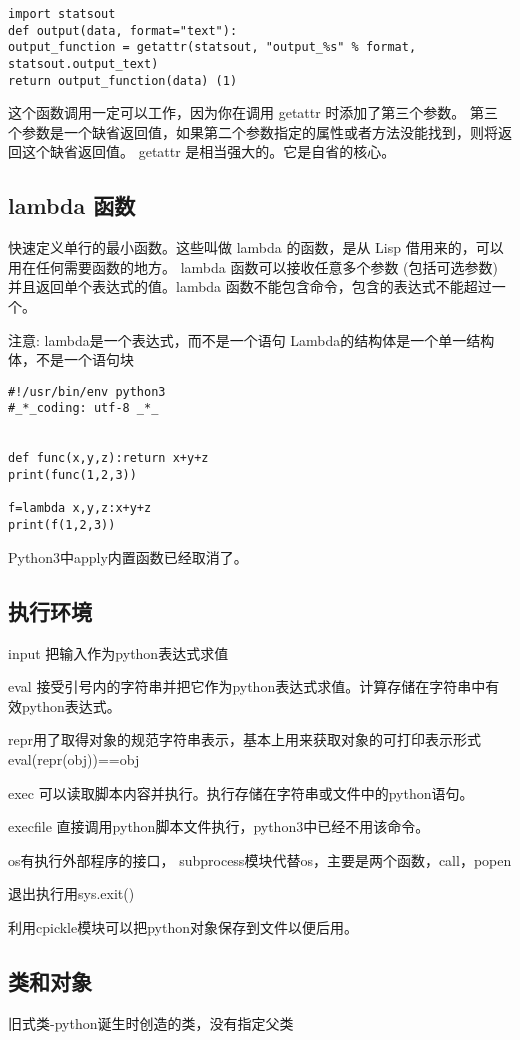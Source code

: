 \documentclass[twoside,11pt]{book}
\begin{document}
\begin{lstlisting}
import statsout
def output(data, format="text"):
output_function = getattr(statsout, "output_%s" % format, statsout.output_text)
return output_function(data) (1)
\end{lstlisting}

这个函数调用一定可以工作，因为你在调用 getattr 时添加了第三个参数。 第三个参数是一个缺省返回值，如果第二个参数指定的属性或者方法没能找到，则将返回这个缺省返回值。
getattr 是相当强大的。它是自省的核心。

\subsection{lambda 函数}
快速定义单行的最小函数。这些叫做
lambda 的函数，是从 Lisp 借用来的，可以用在任何需要函数的地方。
lambda 函数可以接收任意多个参数 (包括可选参数) 并且返回单个表达式的值。lambda 函数不能包含命令，包含的表达式不能超过一个。

注意:
lambda是一个表达式，而不是一个语句
Lambda的结构体是一个单一结构体，不是一个语句块
\begin{lstlisting}
#!/usr/bin/env python3
#_*_coding: utf-8 _*_


def func(x,y,z):return x+y+z
print(func(1,2,3))

f=lambda x,y,z:x+y+z
print(f(1,2,3))
\end{lstlisting}
Python3中apply内置函数已经取消了。

\subsection{执行环境}
input 把输入作为python表达式求值

eval 接受引号内的字符串并把它作为python表达式求值。计算存储在字符串中有效python表达式。

repr用了取得对象的规范字符串表示，基本上用来获取对象的可打印表示形式
eval(repr(obj))==obj

exec 可以读取脚本内容并执行。执行存储在字符串或文件中的python语句。

execfile 直接调用python脚本文件执行，python3中已经不用该命令。

os有执行外部程序的接口，
subprocess模块代替os，主要是两个函数，call，popen

退出执行用sys.exit()

利用cpickle模块可以把python对象保存到文件以便后用。




\subsection{类和对象}
旧式类-python诞生时创造的类，没有指定父类
\end{document}
